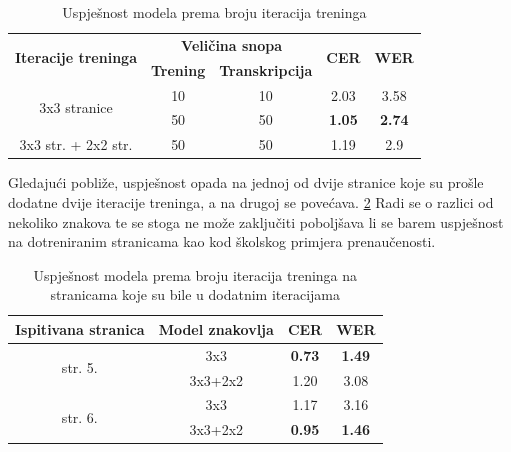 \documentclass[zavrsnirad]{fer}
\begin{document}
\bgroup
\def\arraystretch{1.25}
\begin{table}[h]
	\centering
	\begin{tabular}{|c|c|c|c|c|}
		\hline
		\multirow{2}{*}{\textbf{Iteracije treninga}} & \multicolumn{2}{c|}{\textbf{Veličina snopa}} & \multicolumn{1}{c|}{\multirow{2}{*}{\textbf{CER}}} & \multicolumn{1}{c|}{\multirow{2}{*}{\textbf{WER}}} \\ \cline{2-3}
		
		& \textbf{Trening}  & \textbf{Transkripcija}  & \multicolumn{1}{c|}{}  & \multicolumn{1}{c|}{}  \\ \hline
		\multirow{2}{*}{3x3 stranice} & 10 & 10 & 2.03 & 3.58  \\ \cline{2-5}
		 		& 50  & 50 & \textbf{1.05} & \textbf{2.74}   \\ \hline
		3x3 str. + 2x2 str. & 50 & 50 & 1.19 & 2.9 \\ \hline                                              
	\end{tabular}
	\caption{Uspješnost modela prema broju iteracija treninga}
	\label{tab:7.3}
\end{table}
\egroup


Gledajući pobliže, uspješnost opada na jednoj od dvije stranice koje su prošle dodatne dvije iteracije treninga, a na drugoj se povećava. \ref{tab:pages5and6} Radi se o razlici od nekoliko znakova te se stoga ne može zaključiti poboljšava li se barem uspješnost na dotreniranim stranicama kao kod školskog primjera prenaučenosti.


\bgroup
\def\arraystretch{1.25}
\begin{table}[hbt]
	\centering
	\begin{tabular}{|c|c|c|c|}
		\hline
		\textbf{Ispitivana stranica} & \textbf{Model znakovlja} & \textbf{CER} & \textbf{WER} \\ \hline
		\multirow{2}{*}{str. 5.} & 3x3 & \textbf{0.73} & \textbf{1.49} \\ \cline{2-4}
								 & 3x3+2x2 & 1.20 & 3.08 \\ \hline
		\multirow{2}{*}{str. 6.} & 3x3 & 1.17 & 3.16 \\ \cline{2-4}
								 & 3x3+2x2 & \textbf{0.95} & \textbf{1.46} \\ \hline
	\end{tabular}
	\caption{Uspješnost modela prema broju iteracija treninga na stranicama koje su bile u dodatnim iteracijama}
	\label{tab:pages5and6}
\end{table}
\egroup

\FloatBarrier
\end{document}
